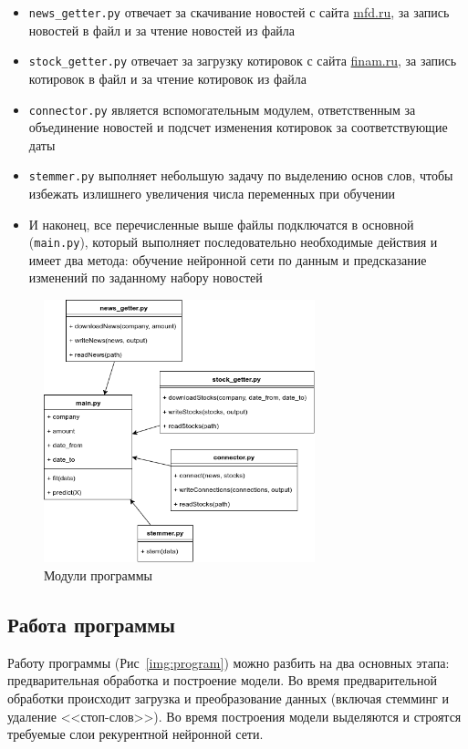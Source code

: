 \documentclass[14pt]{matmex-diploma-custom}
\begin{document}
\begin{itemize}
\item \texttt{news\_getter.py} отвечает за скачивание новостей с сайта \url{mfd.ru}, за запись новостей в файл и за чтение новостей из файла
\item \texttt{stock\_getter.py} отвечает за загрузку котировок с сайта \url{finam.ru}, за запись котировок в файл и за чтение котировок из файла
\item \texttt{connector.py} является вспомогательным модулем, ответственным за объединение новостей и подсчет изменения котировок за соответствующие даты
\item \texttt{stemmer.py} выполняет небольшую задачу по выделению основ слов, чтобы избежать излишнего увеличения числа переменных при обучении
\item И наконец, все перечисленные выше файлы подключатся в основной (\texttt{main.py}), который выполняет последовательно необходимые действия и имеет два метода: обучение нейронной сети по данным и предсказание изменений по заданному набору новостей
\end{itemize}

\begin{figure}[h]
\centering
\includegraphics[width=0.7\textwidth]{img/class}
\caption{Модули программы}
\label{img:class}
\end{figure}

\subsection{Работа программы}

Работу программы (Рис~\ref{img:program}) можно разбить на два основных этапа: предварительная обработка и построение модели. Во время предварительной обработки происходит загрузка и преобразование данных (включая стемминг и удаление <<стоп-слов>>). Во время построения модели выделяются и строятся требуемые слои рекурентной нейронной сети.
\end{document}
